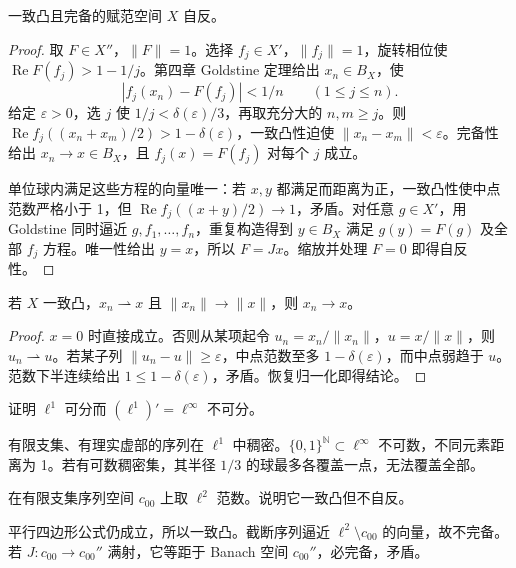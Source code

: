 \begin{theorem}\label{thm:y5-milman}
一致凸且完备的赋范空间 $X$ 自反。
\end{theorem}
\begin{proof}
取 $F\in X''$，$\|F\|=1$。选择 $f_j\in X'$，$\|f_j\|=1$，旋转相位使 $\operatorname{Re}F(f_j)>1-1/j$。第四章 Goldstine 定理给出 $x_n\in B_X$，使
\[
 |f_j(x_n)-F(f_j)|<1/n\qquad(1\le j\le n).
\]
给定 $\varepsilon>0$，选 $j$ 使 $1/j<\delta(\varepsilon)/3$，再取充分大的 $n,m\ge j$。则 $\operatorname{Re}f_j((x_n+x_m)/2)>1-\delta(\varepsilon)$，一致凸性迫使 $\|x_n-x_m\|<\varepsilon$。完备性给出 $x_n\to x\in B_X$，且 $f_j(x)=F(f_j)$ 对每个 $j$ 成立。

单位球内满足这些方程的向量唯一：若 $x,y$ 都满足而距离为正，一致凸性使中点范数严格小于 1，但 $\operatorname{Re}f_j((x+y)/2)\to1$，矛盾。对任意 $g\in X'$，用 Goldstine 同时逼近 $g,f_1,\ldots,f_n$，重复构造得到 $y\in B_X$ 满足 $g(y)=F(g)$ 及全部 $f_j$ 方程。唯一性给出 $y=x$，所以 $F=Jx$。缩放并处理 $F=0$ 即得自反性。
\end{proof}

\begin{proposition}[一致凸空间的范数判据]
若 $X$ 一致凸，$x_n\rightharpoonup x$ 且 $\|x_n\|\to\|x\|$，则 $x_n\to x$。
\end{proposition}
\begin{proof}
$x=0$ 时直接成立。否则从某项起令 $u_n=x_n/\|x_n\|$，$u=x/\|x\|$，则 $u_n\rightharpoonup u$。若某子列 $\|u_n-u\|\ge\varepsilon$，中点范数至多 $1-\delta(\varepsilon)$，而中点弱趋于 $u$。范数下半连续给出 $1\le1-\delta(\varepsilon)$，矛盾。恢复归一化即得结论。
\end{proof}

\begin{exercise}[可分性不能倒推对偶可分]\label{ex:y5-separability}
证明 $\ell^1$ 可分而 $(\ell^1)'=\ell^\infty$ 不可分。
\end{exercise}
\begin{solution}
有限支集、有理实虚部的序列在 $\ell^1$ 中稠密。$\{0,1\}^{\mathbb N}\subset\ell^\infty$ 不可数，不同元素距离为 1。若有可数稠密集，其半径 $1/3$ 的球最多各覆盖一点，无法覆盖全部。
\end{solution}

\begin{exercise}[完备性不可省]\label{ex:y5-completeness}
在有限支集序列空间 $c_{00}$ 上取 $\ell^2$ 范数。说明它一致凸但不自反。
\end{exercise}
\begin{solution}
平行四边形公式仍成立，所以一致凸。截断序列逼近 $\ell^2\setminus c_{00}$ 的向量，故不完备。若 $J:c_{00}\to c_{00}''$ 满射，它等距于 Banach 空间 $c_{00}''$，必完备，矛盾。
\end{solution}
